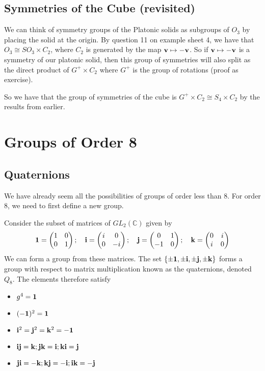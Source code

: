 \documentclass{article}
\begin{document}
\subsection{Symmetries of the Cube (revisited)}
We can think of symmetry groups of the Platonic solids as subgroups of $O_3$ by placing the solid at the origin. By question 11 on example sheet 4, we have that $O_3 \cong SO_3 \times C_2$, where $C_2$ is generated by the map $\vb v \mapsto -\vb v$. So if $\vb v\mapsto -\vb v$ is a symmetry of our platonic solid, then this group of symmetries will also split as the direct product of $G^+ \times C_2$ where $G^+$ is the group of rotations (proof as exercise).

So we have that the group of symmetries of the cube is $G^+ \times C_2 \cong S_4 \times C_2$ by the results from earlier.

\section{Groups of Order 8}
\subsection{Quaternions}
We have already seem all the possibilities of groups of order less than 8. For order 8, we need to first define a new group.
\begin{definition}
    Consider the subset of matrices of $GL_2(\mathbb C)$ given by
    \[ \vb 1 = \begin{pmatrix}
            1 & 0 \\ 0 & 1
        \end{pmatrix};\quad \vb i = \begin{pmatrix}
            i & 0 \\ 0 & -i
        \end{pmatrix};\quad \vb j = \begin{pmatrix}
            0 & 1 \\ -1 & 0
        \end{pmatrix};\quad \vb k = \begin{pmatrix}
            0 & i \\ i & 0
        \end{pmatrix} \]
    We can form a group from these matrices. The set $\{ \pm \vb 1, \pm \vb i, \pm \vb j, \pm \vb k \}$ forms a group with respect to matrix multiplication known as the quaternions, denoted $Q_8$. The elements therefore satisfy
    \begin{itemize}
        \item $g^4 = \vb 1$
        \item $(-\vb 1)^2 = \vb 1$
        \item $\vb i^2 = \vb j^2 = \vb k^2 = -\vb 1$
        \item $\vb i \vb j = \vb k; \vb j \vb k = \vb i; \vb k \vb i = \vb j$
        \item $\vb j \vb i = -\vb k; \vb k \vb j = -\vb i; \vb i \vb k = -\vb j$
    \end{itemize}
\end{definition}
\end{document}
